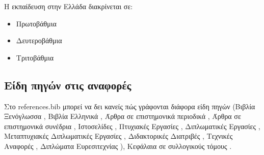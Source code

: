 H εκπαίδευση στην Ελλάδα διακρίνεται σε:
\begin{itemize}
\item Πρωτοβάθμια 
\item Δευτεροβάθμια 
\item Τριτοβάθμια 
\end{itemize}

\subsection{Είδη πηγών στις αναφορές}

Στο references.bib μπορεί να δει κανείς πώς γράφονται διάφορα είδη πηγών 
(Βιβλία Ξενόγλωσσα \cite{goossens93},
Βιβλία Ελληνικά \cite{greekbook},
Άρθρα σε επιστημονικά περιοδικά \cite{LiArTs13},
Άρθρα σε επιστημονικά συνέδρια \cite{dcis2011},
Ιστοσελίδες \cite{LaTeXProject},
Πτυχιακές Εργασίες \cite{elli05},
Διπλωματικές Εργασίες \cite{zoi04},
Μεταπτυχιακές Διπλωματικές Εργασίες \cite{master04},
Διδακτορικές Διατριβές \cite{phd045},
Τεχνικές Αναφορές \cite{MSU-CSE-05-29},
Διπλώματα Ευρεσιτεχνίας \cite{viswanathan2014convenient}),
Κεφάλαια σε συλλογικούς τόμους
\cite{[PS11]}.

